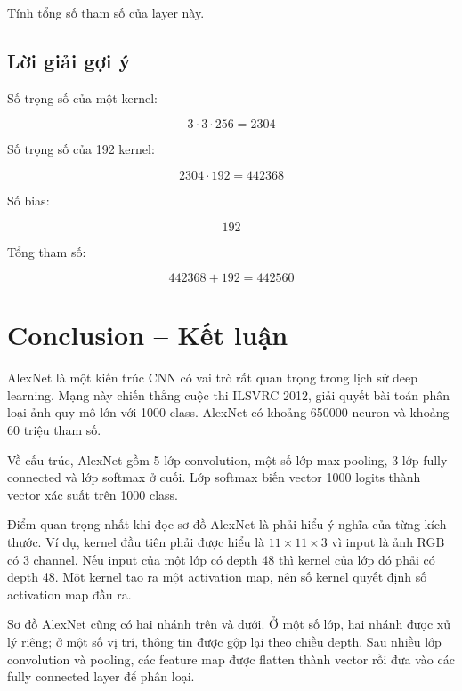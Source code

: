 Tính tổng số tham số của layer này.

\subsection*{Lời giải gợi ý}

Số trọng số của một kernel:

\[
    3\cdot3\cdot256=2304
\]

Số trọng số của 192 kernel:

\[
    2304\cdot192=442368
\]

Số bias:

\[
    192
\]

Tổng tham số:

\[
    442368+192=442560
\]

\section*{Conclusion -- Kết luận}

AlexNet là một kiến trúc CNN có vai trò rất quan trọng trong lịch sử deep learning. Mạng này chiến thắng cuộc thi ILSVRC 2012, giải quyết bài toán phân loại ảnh quy mô lớn với 1000 class. AlexNet có khoảng 650000 neuron và khoảng 60 triệu tham số.

Về cấu trúc, AlexNet gồm 5 lớp convolution, một số lớp max pooling, 3 lớp fully connected và lớp softmax ở cuối. Lớp softmax biến vector 1000 logits thành vector xác suất trên 1000 class.

Điểm quan trọng nhất khi đọc sơ đồ AlexNet là phải hiểu ý nghĩa của từng kích thước. Ví dụ, kernel đầu tiên phải được hiểu là $11\times11\times3$ vì input là ảnh RGB có 3 channel. Nếu input của một lớp có depth 48 thì kernel của lớp đó phải có depth 48. Một kernel tạo ra một activation map, nên số kernel quyết định số activation map đầu ra.

Sơ đồ AlexNet cũng có hai nhánh trên và dưới. Ở một số lớp, hai nhánh được xử lý riêng; ở một số vị trí, thông tin được gộp lại theo chiều depth. Sau nhiều lớp convolution và pooling, các feature map được flatten thành vector rồi đưa vào các fully connected layer để phân loại.